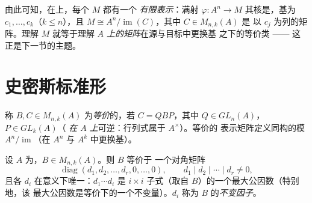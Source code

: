 \begin{remark}\label{rem:b3:modules:presentation}
由此可知，在上，每个 $M$ 都有一个
\emph{有限表示}：满射 $\varphi\colon A^n \to M$
其核是，基为 $c_1, \dots, c_k$（$k \leq n$），且 $M
\cong A^n / \operatorname{im}(C)$，其中 $C \in M_{n,k}(A)$ 是
以 $c_j$ 为列的矩阵。理解 $M$ 就等于理解
\emph{$A$ 上的矩阵}在源与目标中更换基
之下的等价类 —— 这正是下一节的主题。
\end{remark}

\section{史密斯标准形}

\begin{definition}\label{def:b3:modules:equivalence}
称 $B, C \in M_{n,k}(A)$ 为\emph{等价}的，若 $C =
QBP$，其中 $Q \in GL_n(A)$，$P \in GL_k(A)$（
\emph{在 $A$ 上}可逆：行列式属于 $A^\times$）。等价的
表示矩阵定义同构的模 $A^n/
\operatorname{im}$（在 $A^n$ 与 $A^k$ 中更换基）。
\end{definition}

\begin{theorem}[史密斯标准形]\label{thm:b3:modules:smith}
设 $A$ 为，$B \in M_{n,k}(A)$。则 $B$ 等价于
一个对角矩阵
\[
\operatorname{diag}(d_1, d_2, \dots, d_r, 0, \dots, 0),
\qquad d_1 \mid d_2 \mid \cdots \mid d_r \neq 0 ,
\]
且各 $d_i$ 在意义下唯一：$d_1 \cdots d_i$ 是
$i \times i$ 子式（取自 $B$）的一个最大公因数（特别地，该
最大公因数是等价下的一个不变量）。$d_i$ 称为
$B$ 的\emph{不变因子}。
\end{theorem}

